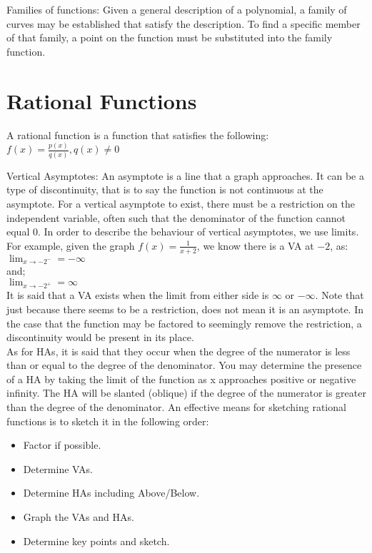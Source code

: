 \documentclass{article}
\begin{document}
Families of functions: Given a general description of a polynomial, a family of curves may be established that satisfy the description. To find a specific member of that family, a point on the function must be substituted into the family function.

\section{Rational Functions}

A rational function is a function that satisfies the following: \\ $f(x)=\frac{p(x)}{q(x)}, q(x) \neq 0$

Vertical Asymptotes: An asymptote is a line that a graph approaches. It can be a type of discontinuity, that is to say the function is not continuous at the asymptote. For a vertical asymptote to exist, there must be a restriction on the independent variable, often such that the denominator of the function cannot equal $0$. In order to describe the behaviour of vertical asymptotes, we use limits. For example, given the graph $f(x)=\frac{1}{x+2}$, we know there is a VA at $-2$, as: \\

$\lim_{x\to -2^-} = -\infty$ \\
and; \\
$\lim_{x\to -2^+} = \infty$ \\

It is said that a VA exists when the limit from either side is $\infty$ or $-\infty$. Note that just because there seems to be a restriction, does not mean it is an asymptote. In the case that the function may be factored to seemingly remove the restriction, a discontinuity would be present in its place. \\

As for HAs, it is said that they occur when the degree of the numerator is less than or equal to the degree of the denominator. You may determine the presence of a HA by taking the limit of the function as x approaches positive or negative infinity. The HA will be slanted (oblique) if the degree of the numerator is greater than the degree of the denominator. An effective means for sketching rational functions is to sketch it in the following order: \begin{itemize}
    \item Factor if possible.
    \item Determine VAs.
    \item Determine HAs including Above/Below.
    \item Graph the VAs and HAs.
    \item Determine key points and sketch. \\
\end{itemize}
\end{document}
